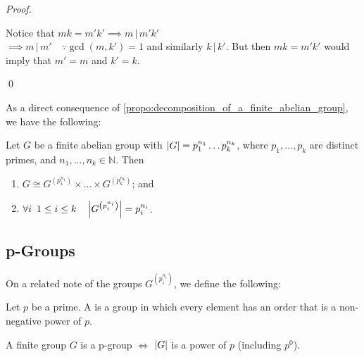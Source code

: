 \begin{proof}
\begin{enumerate}
      Notice that $mk = m'k' \implies m \, | \, m'k'$ \\
      $\implies m \, | \, m' \quad \because \gcd(m, k') = 1$
      and similarly $k \, | \, k'$. But then $mk = m'k'$ would imply that $m' = m$ and $k' = k$.
  \end{enumerate}\qed
\end{proof}

As a direct consequence of \cref{propo:decomposition_of_a_finite_abelian_group}, we have the following:

\begin{thm}
\label{thm:primary_decomposition}
  Let $G$ be a finite abelian group with $\left|G\right| = p_1^{n_1} \hdots p_k^{n_k}$, where $p_1, ..., p_k$ are distinct primes, and $n_1, ..., n_k \in \mathbb{N}$. Then
  \begin{enumerate}
    \item $G \cong G^{\left(p_1^{n_1}\right)} \times \hdots \times G^{\left(p_k^{n_k}\right)}$; and
    \item $\forall i \enspace 1 \leq i \leq k \quad \left|G^{\left(p_i^{n_i}\right)}\right| = p_i^{n_i}$.
  \end{enumerate}
\end{thm}


\subsection{p-Groups}%
\label{sub:p_groups}

On a related note of the groups $G^{\left(p_i^{n_i}\right)}$, we define the following:

\begin{defn}[p-Group]
\label{defn:p_group}
  Let $p$ be a prime. A  is a group in which every element has an order that is a non-negative power of $p$.
\end{defn}

\begin{propo}
\label{propo:p_groups_are_finite}
  A finite group $G$ is a p-group $\iff$ $\left|G\right|$ is a power of $p$ (including $p^0$).
\end{propo}

